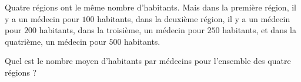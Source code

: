 
\begin{exercice}\label{exosmath-0315}

Quatre régions ont le même nombre d'habitants. Mais dans la première région, il y a un médecin pour \( 100\) habitants, dans la deuxième région, il y a un médecin pour \( 200\) habitants, dans la troisième, un médecin pour \( 250\) habitants, et dans la quatrième, un médecin pour \( 500\) habitants.

Quel est le nombre moyen d'habitants par médecins pour l'ensemble des quatre régions ?

\end{exercice}

